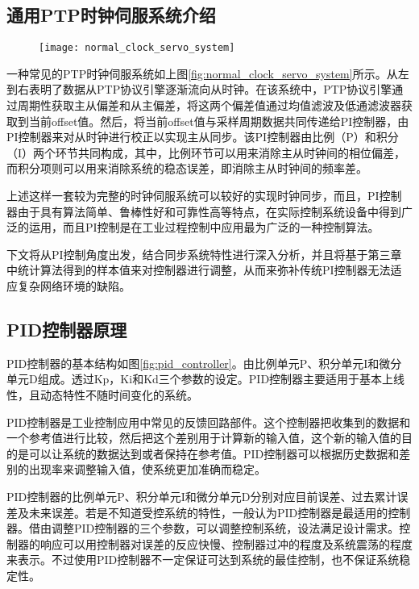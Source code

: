 \subsection{通用PTP时钟伺服系统介绍}
\begin{figure}[htbp]
  \centering
  \begin{minipage}[b]{0.7\textwidth}
   \captionstyle{\centering}
   \centering
   \texttt{[image: normal\_clock\_servo\_system]}
  \end{minipage}     
\end{figure}

一种常见的PTP时钟伺服系统如上图\ref{fig:normal_clock_servo_system}所示。从左到右表明了数据从PTP协议引擎逐渐流向从时钟。在该系统中，PTP协议引擎通过周期性获取主从偏差和从主偏差，将这两个偏差值通过均值滤波及低通滤波器获取到当前offset值。然后，将当前offset值与采样周期数据共同传递给PI控制器，由PI控制器来对从时钟进行校正以实现主从同步。该PI控制器由比例（P）和积分（I）两个环节共同构成，其中，比例环节可以用来消除主从时钟间的相位偏差，而积分项则可以用来消除系统的稳态误差，即消除主从时钟间的频率差\supercite{58}。

上述这样一套较为完整的时钟伺服系统可以较好的实现时钟同步，而且，PI控制器由于具有算法简单、鲁棒性好和可靠性高等特点，在实际控制系统设备中得到广泛的运用，而且PI控制是在工业过程控制中应用最为广泛的一种控制算法。

下文将从PI控制角度出发，结合同步系统特性进行深入分析，并且将基于第三章中统计算法得到的样本值来对控制器进行调整，从而来弥补传统PI控制器无法适应复杂网络环境的缺陷。

\subsection{PID控制器原理}
PID控制器的基本结构如图\ref{fig:pid_controller}。由比例单元P、积分单元I和微分单元D组成。透过Kp，Ki和Kd三个参数的设定。PID控制器主要适用于基本上线性，且动态特性不随时间变化的系统。

PID控制器是工业控制应用中常见的反馈回路部件。这个控制器把收集到的数据和一个参考值进行比较，然后把这个差别用于计算新的输入值，这个新的输入值的目的是可以让系统的数据达到或者保持在参考值。PID控制器可以根据历史数据和差别的出现率来调整输入值，使系统更加准确而稳定。

PID控制器的比例单元P、积分单元I和微分单元D分别对应目前误差、过去累计误差及未来误差。若是不知道受控系统的特性，一般认为PID控制器是最适用的控制器。借由调整PID控制器的三个参数，可以调整控制系统，设法满足设计需求。控制器的响应可以用控制器对误差的反应快慢、控制器过冲的程度及系统震荡的程度来表示。不过使用PID控制器不一定保证可达到系统的最佳控制，也不保证系统稳定性。

